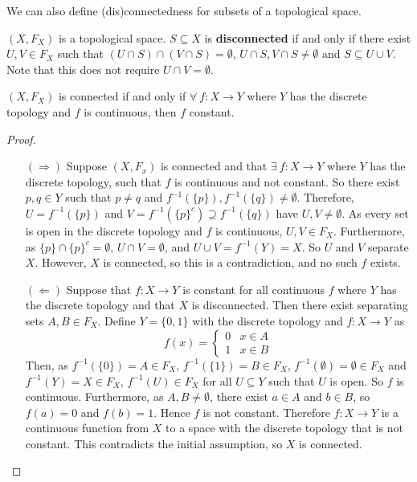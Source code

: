 We can also define (dis)connectedness for subsets of a topological space. 
\begin{definition}
	$(X,F_X)$ is a topological space. $S \subseteq X$ is \textbf{disconnected} if and only if there exist $U,V \in F_X$ such that $(U \cap S) \cap (V \cap S) = \emptyset$, $U \cap S, V \cap S \neq \emptyset$ and $S \subseteq U \cup V$. Note that this does not require $U \cap V = \emptyset$. 
\end{definition}
\begin{smallfact}
	$(X, F_X)$ is connected if and only if $\forall \ f : X \to Y$ where $Y$ has the discrete topology and $f$ is continuous, then $f$ constant. 
\end{smallfact}
\begin{proof}
	\begin{itemize}
		\item[$(\Rightarrow)$] Suppose $(X,F_x)$ is connected and that $\exists \ f : X \to Y$ where $Y$ has the discrete topology, such that $f$ is continuous and not constant. So there exist $p,q \in Y$ such that $p \neq q$ and $f^{-1}(\{p\}), f^{-1}(\{q\}) \neq \emptyset$. Therefore, $U = f^{-1}(\{p\})$ and $V = f^{-1}(\{p\}^c) \supseteq f^{-1}(\{q\})$ have $U,V \neq \emptyset$. As every set is open in the discrete topology and $f$ is continuous, $U,V \in F_X$. Furthermore, as $\{p\} \cap \{p\}^c = \emptyset$, $U \cap V = \emptyset$, and $U \cup V = f^{-1}(Y) = X$. So $U$ and $V$ separate $X$. However, $X$ is connected, so this is a contradiction, and no such $f$ exists. 
		\item[$(\Leftarrow)$] Suppose that $f : X \to Y$ is constant for all continuous $f$ where $Y$ has the discrete topology and that $X$ is disconnected. Then there exist separating sets $A,B \in F_X$. Define $Y = \{0,1\}$ with the discrete topology and $f : X \to Y$ as
		\[f(x) = \left\{ 
		\begin{array}{cc}
			0 & x \in A \\
			1 & x \in B 
		\end{array}
		\right.\]
		Then, as $f^{-1}(\{0\}) = A \in F_X$, $f^{-1}(\{1\}) = B \in F_X$, $f^{-1}(\emptyset) = \emptyset \in F_X$ and $f^{-1}(Y) = X \in F_X$, $f^{-1}(U) \in F_X$ for all $U \subseteq Y$ such that $U$ is open. So $f$ is continuous. Furthermore, as $A,B \neq \emptyset$, there exist $a \in A$ and $b \in B$, so $f(a) = 0$ and $f(b) = 1$. Hence $f$ is not constant. Therefore $f : X \to Y$ is a continuous function from $X$ to a space with the discrete topology that is not constant. This contradicts the initial assumption, so $X$ is connected. 
	\end{itemize}
\end{proof}

